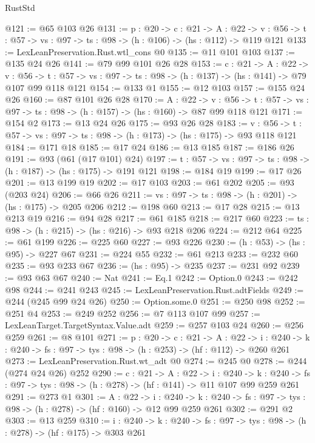 \begin{lexlean}{RustStd}
\begin{coremodule}
{\begin{coremodule}
{{{{{{{{{@121 := @65 @103 @26
@131 := {p : @20} ->
  {c : @21} ->
  {A : @22} ->
  {v : @56} -> {t : @57} -> {vs : @97} -> {ts : @98} -> (h : @106) -> (hs : @112) -> @119 @121
@133 := LexLeanPreservation.Rust.wtl_cons @0
@135 := @11 @101 @103
@137 := @135 @24 @26
@141 := @79 @99 @101 @26 @28
@153 := {c : @21} ->
  {A : @22} ->
  {v : @56} ->
  {t : @57} -> {vs : @97} -> {ts : @98} -> (h : @137) -> (hs : @141) -> @79 @107 @99 @118 @121
@154 := @133 @1
@155 := @12 @103
@157 := @155 @24 @26
@160 := @87 @101 @26 @28
@170 := {A : @22} ->
  {v : @56} ->
  {t : @57} -> {vs : @97} -> {ts : @98} -> (h : @157) -> (hs : @160) -> @87 @99 @118 @121
@171 := @154 @2
@173 := @13 @24 @26
@175 := @93 @26 @28
@183 := {v : @56} ->
  {t : @57} -> {vs : @97} -> {ts : @98} -> (h : @173) -> (hs : @175) -> @93 @118 @121
@184 := @171 @18
@185 := @17 @24
@186 := @13 @185
@187 := @186 @26
@191 := @93 (@61 (@17 @101) @24)
@197 := {t : @57} -> {vs : @97} -> {ts : @98} -> (h : @187) -> (hs : @175) -> @191 @121
@198 := @184 @19
@199 := @17 @26
@201 := @13 @199 @19
@202 := @17 @103
@203 := @61 @202
@205 := @93 (@203 @24)
@206 := @66 @26
@211 := {vs : @97} -> {ts : @98} -> (h : @201) -> (hs : @175) -> @205 @206
@212 := @198 @60
@213 := @17 @28
@215 := @13 @213 @19
@216 := @94 @28
@217 := @61 @185
@218 := @217 @60
@223 := {ts : @98} -> (h : @215) -> (hs : @216) -> @93 @218 @206
@224 := @212 @64
@225 := @61 @199
@226 := @225 @60
@227 := @93 @226
@230 := (h : @53) -> (hs : @95) -> @227 @67
@231 := @224 @55
@232 := @61 @213
@233 := @232 @60
@235 := @93 @233 @67
@236 := (hs : @95) -> @235
@237 := @231 @92
@239 := @93 @63 @67
@240 := Nat
@241 := Eq.{1}
@242 := Option.{0}
@243 := @242 @98
@244 := @241 @243
@245 := LexLeanPreservation.Rust.adtFields
@249 := @244 (@245 @99 @24 @26)
@250 := Option.some.{0}
@251 := @250 @98
@252 := @251 @4
@253 := @249 @252
@256 := @7 @113 @107 @99
@257 := LexLeanTarget.TargetSyntax.Value.adt
@259 := @257 @103 @24
@260 := @256 @259
@261 := @8 @101
@271 := {p : @20} ->
  {c : @21} ->
  {A : @22} ->
  {i : @240} -> {k : @240} -> {fs : @97} -> {tys : @98} -> (h : @253) -> (hf : @112) -> @260 @261
@273 := LexLeanPreservation.Rust.wt_adt @0
@274 := @245 @0
@278 := @244 (@274 @24 @26) @252
@290 := {c : @21} ->
  {A : @22} ->
  {i : @240} ->
  {k : @240} -> {fs : @97} -> {tys : @98} -> (h : @278) -> (hf : @141) -> @11 @107 @99 @259 @261
@291 := @273 @1
@301 := {A : @22} ->
  {i : @240} ->
  {k : @240} -> {fs : @97} -> {tys : @98} -> (h : @278) -> (hf : @160) -> @12 @99 @259 @261
@302 := @291 @2
@303 := @13 @259
@310 := {i : @240} ->
  {k : @240} -> {fs : @97} -> {tys : @98} -> (h : @278) -> (hf : @175) -> @303 @261
}}}}}}}}}
\end{coremodule}}
\end{coremodule}
\end{lexlean}
